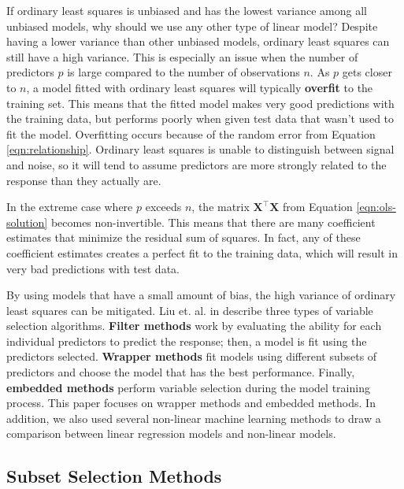 \documentclass{article}
\begin{document}
If ordinary least squares is unbiased and has the lowest variance among all unbiased models, why should we use any other type of linear model? Despite having a lower variance than other unbiased models, ordinary least squares can still have a high variance. This is especially an issue when the number of predictors $p$ is large compared to the number of observations $n$. As $p$ gets closer to $n$, a model fitted with ordinary least squares will typically \textbf{overfit} to the training set. This means that the fitted model makes very good predictions with the training data, but performs poorly when given test data that wasn't used to fit the model. Overfitting occurs because of the random error from Equation \ref{eqn:relationship}. Ordinary least squares is unable to distinguish between signal and noise, so it will tend to assume predictors are more strongly related to the response than they actually are.

In the extreme case where $p$ exceeds $n$, the matrix $\mathbf{X}^\top \mathbf{X}$ from Equation \ref{eqn:ols-solution} becomes non-invertible. This means that there are many coefficient estimates that minimize the residual sum of squares. In fact, any of these coefficient estimates creates a perfect fit to the training data, which will result in very bad predictions with test data.

By using models that have a small amount of bias, the high variance of ordinary least squares can be mitigated. Liu et. al. in \cite{liu2020logsum} describe three types of variable selection algorithms. \textbf{Filter methods} work by evaluating the ability for each individual predictors to predict the response; then, a model is fit using the predictors selected. \textbf{Wrapper methods} fit models using different subsets of predictors and choose the model that has the best performance. Finally, \textbf{embedded methods} perform variable selection during the model training process. This paper focuses on wrapper methods and embedded methods. In addition, we also used several non-linear machine learning methods to draw a comparison between linear regression models and non-linear models.

\subsection{Subset Selection Methods}
\end{document}
